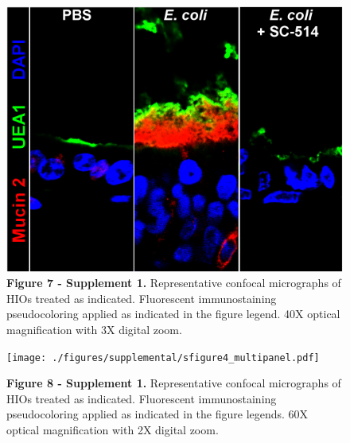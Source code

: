 \documentclass[9pt,lineo]{elife}
\begin{document}
\begin{figure}
\begin{fullwidth}
\centering\includegraphics[width=0.5\linewidth]{./figures/figure7/Supplemental_Figure4_Muc2-NFkB.pdf}
\caption*{\textbf{Figure 7 - Supplement 1. }Representative confocal micrographs of HIOs treated as indicated. Fluorescent immunostaining pseudocoloring applied as indicated in the figure legend. 40X optical magnification with 3X digital zoom.}
\label{fig:fullwidth}
\end{fullwidth}
\end{figure}
\begin{figure}
\begin{fullwidth}
\centering\texttt{[image: ./figures/supplemental/sfigure4\_multipanel.pdf]}
\caption*{\textbf{Figure 8 - Supplement 1. }Representative confocal micrographs of HIOs treated as indicated. Fluorescent immunostaining pseudocoloring applied as indicated in the figure legends. 60X optical magnification with 2X digital zoom.}
\label{fig:fullwidth}
\end{fullwidth}
\end{figure}
\end{document}
